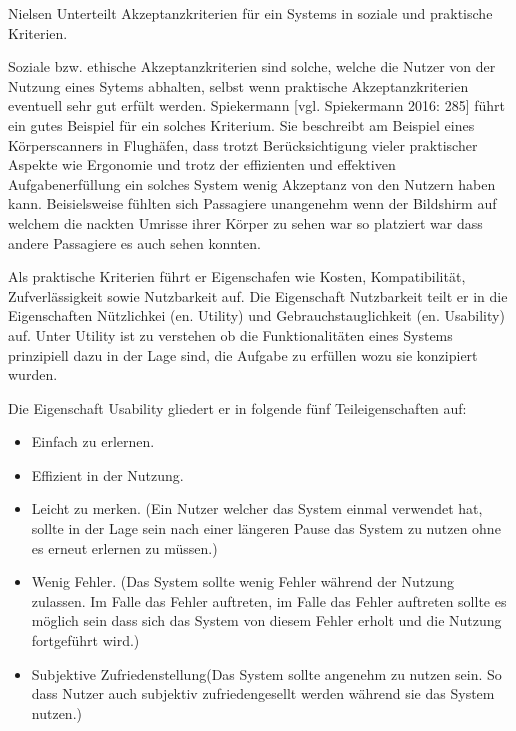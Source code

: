 Nielsen Unterteilt Akzeptanzkriterien für ein Systems in soziale und praktische Kriterien.

Soziale bzw. ethische Akzeptanzkriterien sind solche, welche  die Nutzer von der Nutzung eines Sytems abhalten, selbst wenn praktische Akzeptanzkriterien eventuell sehr gut erfült werden. 
Spiekermann [vgl. Spiekermann 2016: 285] führt ein gutes Beispiel für ein solches Kriterium. Sie beschreibt am Beispiel eines Körperscanners in Flughäfen, dass trotzt  Berücksichtigung vieler 
praktischer Aspekte wie Ergonomie und trotz der effizienten und effektiven Aufgabenerfüllung ein solches System wenig Akzeptanz von den Nutzern haben kann. Beisielsweise fühlten sich 
Passagiere unangenehm wenn der Bildshirm auf welchem die nackten Umrisse ihrer Körper zu sehen war so platziert war dass andere Passagiere es auch sehen konnten.  

Als praktische Kriterien führt er Eigenschafen wie Kosten, Kompatibilität, Zufverlässigkeit sowie Nutzbarkeit auf. Die Eigenschaft Nutzbarkeit teilt er in die Eigenschaften Nützlichkei (en. Utility) 
und Gebrauchstauglichkeit (en. Usability) auf. Unter Utility ist zu verstehen ob die Funktionalitäten eines Systems prinzipiell dazu in der Lage sind, die Aufgabe zu erfüllen wozu sie konzipiert wurden.

Die Eigenschaft Usability gliedert er in folgende fünf Teileigenschaften auf: 

\begin{itemize}
	\item Einfach zu erlernen.
	\item Effizient in der Nutzung.
	\item Leicht zu merken. (Ein Nutzer welcher das System einmal verwendet hat, sollte in der Lage sein nach einer längeren Pause das System zu nutzen ohne es erneut erlernen zu müssen.)
	\item Wenig Fehler. (Das System sollte wenig Fehler während der Nutzung zulassen. Im Falle das Fehler auftreten, im Falle das Fehler auftreten sollte es möglich sein dass sich das System 
	     	von diesem Fehler erholt und die Nutzung fortgeführt wird.)
	\item Subjektive Zufriedenstellung(Das System sollte angenehm zu nutzen sein. So dass Nutzer auch subjektiv zufriedengesellt werden während sie das System nutzen.)
\end{itemize}


